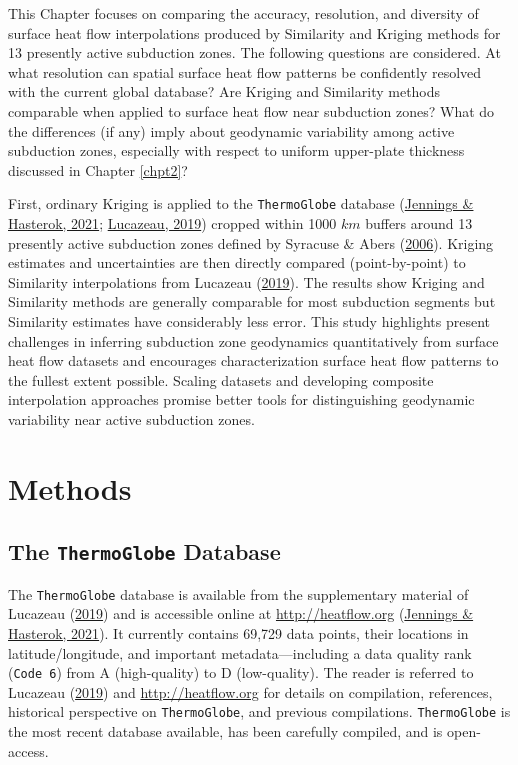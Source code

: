 This Chapter focuses on comparing the accuracy, resolution, and diversity of surface heat flow interpolations produced by Similarity and Kriging methods for 13 presently active subduction zones. The following questions are considered. At what resolution can spatial surface heat flow patterns be confidently resolved with the current global database? Are Kriging and Similarity methods comparable when applied to surface heat flow near subduction zones? What do the differences (if any) imply about geodynamic variability among active subduction zones, especially with respect to uniform upper-plate thickness discussed in Chapter \ref{chpt2}?

First, ordinary Kriging is applied to the \texttt{ThermoGlobe} database (\protect\hyperlink{ref-jennings2021}{Jennings \& Hasterok, 2021}; \protect\hyperlink{ref-lucazeau2019}{Lucazeau, 2019}) cropped within 1000 \(km\) buffers around 13 presently active subduction zones defined by Syracuse \& Abers (\protect\hyperlink{ref-syracuse2006}{2006}). Kriging estimates and uncertainties are then directly compared (point-by-point) to Similarity interpolations from Lucazeau (\protect\hyperlink{ref-lucazeau2019}{2019}). The results show Kriging and Similarity methods are generally comparable for most subduction segments but Similarity estimates have considerably less error. This study highlights present challenges in inferring subduction zone geodynamics quantitatively from surface heat flow datasets and encourages characterization surface heat flow patterns to the fullest extent possible. Scaling datasets and developing composite interpolation approaches promise better tools for distinguishing geodynamic variability near active subduction zones.

\hypertarget{methods}{%
\section{Methods}\label{methods}}

\hypertarget{the-thermoglobe-database}{%
\subsection{\texorpdfstring{The \texttt{ThermoGlobe} Database}{The ThermoGlobe Database}}\label{the-thermoglobe-database}}

The \texttt{ThermoGlobe} database is available from the supplementary material of Lucazeau (\protect\hyperlink{ref-lucazeau2019}{2019}) and is accessible online at \url{http://heatflow.org} (\protect\hyperlink{ref-jennings2021}{Jennings \& Hasterok, 2021}). It currently contains 69,729 data points, their locations in latitude/longitude, and important metadata---including a data quality rank (\texttt{Code\ 6}) from A (high-quality) to D (low-quality). The reader is referred to Lucazeau (\protect\hyperlink{ref-lucazeau2019}{2019}) and \url{http://heatflow.org} for details on compilation, references, historical perspective on \texttt{ThermoGlobe}, and previous compilations. \texttt{ThermoGlobe} is the most recent database available, has been carefully compiled, and is open-access.

